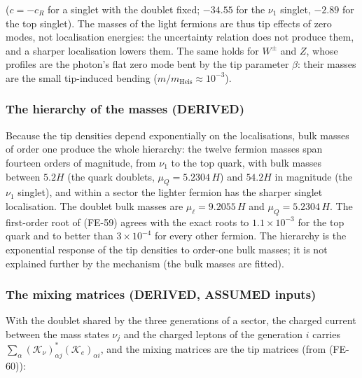 \documentclass[
  10pt,
]{article}
\begin{document}
(\(c = -c_R\) for a singlet with the doublet fixed; \(-34.55\) for the
\(\nu_1\) singlet, \(-2.89\) for the top singlet). The masses of the
light fermions are thus tip effects of zero modes, not localisation
energies: the uncertainty relation does not produce them, and a sharper
localisation lowers them. The same holds for \(W^\pm\) and \(Z\), whose
profiles are the photon's flat zero mode bent by the tip parameter
\(\beta\): their masses are the small tip-induced bending
(\(m/m_{\mathrm{Heis}} \approx 10^{-3}\)).

\hypertarget{the-hierarchy-of-the-masses-derived}{%
\subsubsection*{The hierarchy of the masses
(DERIVED)}\label{the-hierarchy-of-the-masses-derived}}

Because the tip densities depend exponentially on the localisations,
bulk masses of order one produce the whole hierarchy: the twelve fermion
masses span fourteen orders of magnitude, from \(\nu_1\) to the top
quark, with bulk masses between \(5.2H\) (the quark doublets,
\(\mu_Q = 5.2304\,H\)) and \(54.2H\) in magnitude (the \(\nu_1\)
singlet), and within a sector the lighter fermion has the sharper
singlet localisation. The doublet bulk masses are
\(\mu_\ell = 9.2055\,H\) and \(\mu_Q = 5.2304\,H\). The first-order root
of (FE-59) agrees with the exact roots to \(1.1\times10^{-3}\) for the
top quark and to better than \(3\times10^{-4}\) for every other fermion.
The hierarchy is the exponential response of the tip densities to
order-one bulk masses; it is not explained further by the mechanism (the
bulk masses are fitted).

\hypertarget{the-mixing-matrices-derived-assumed-inputs}{%
\subsubsection*{The mixing matrices (DERIVED, ASSUMED
inputs)}\label{the-mixing-matrices-derived-assumed-inputs}}

With the doublet shared by the three generations of a sector, the
charged current between the mass states \(\nu_j\) and the charged
leptons of the generation \(i\) carries
\(\sum_\alpha(\mathcal{K}_\nu)^*_{\alpha j}(\mathcal{K}_e)_{\alpha i}\),
and the mixing matrices are the tip matrices (from (FE-60)):
\end{document}
